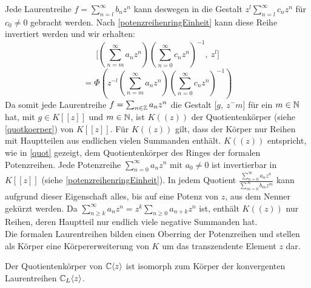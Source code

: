 {Jede Laurentreihe $ f = \sum_{n = l}^{\infty} b_nz^n $ kann deswegen in die Gestalt $z^l\sum_{n = l}^{\infty} c_nz^n $ für $c_0 \neq 0$ gebracht werden. Nach \ref{potenzreihenringEinheit} kann diese Reihe invertiert werden und wir erhalten:
\[\lbrack{\left(\sum_{n = m}^{\infty} a_nz^n\right)\left( \sum_{n = 0}^{\infty} c_nz^n\right)^{-1}},~{z^l}\rbrack\]
\[ = \Phi\left(z^{-l}\left(\sum_{n = m}^{\infty} a_nz^n\right)\left(\sum_{n = 0}^{\infty} c_nz^n\right)^{-1}\right)\]
%
Da somit jede Laurentreihe $ f = \sum_{n\in \mathbb{Z}} a_nz^n $ die Gestalt $\lbrack{g},~{z^-m}\rbrack$ für ein $m \in \mathbb{N}$ hat, mit $g\in K[[z]]$ und $m\in\mathbb{N}$, ist $K((z))$ der Quotientenkörper (siehe \ref{quotkoerper}) von $K[[z]]$.
}
%
%
Für $K((z))$ gilt, dass der Körper nur Reihen mit Hauptteilen aus endlichen vielen Summanden enthält. $K((z))$ entspricht, wie in \ref{quot} gezeigt, dem Quotientenkörper des Ringes der formalen Potenzreihen.  
Jede Potenzreihe $\sum_{n=0}^{\infty} a_nz^n \text{ mit } a_0\neq0$ ist invertierbar in $K[[z]]$ (siehe \ref{potenzreihenringEinheit}). In jedem Quotient $\frac{\sum_{n=0}^{\infty}  a_nz^n}{\sum_{m=0}^\infty b_mz^m}$ kann aufgrund dieser Eigenschaft alles, bis auf eine Potenz von $z$, aus dem Nenner gekürzt werden. Da  $\sum_{n \ge k}^{\infty} a_nz^n =z^k \sum_{n \ge 0} a_{n+k}z^n$ ist, enthält $K((z))$ nur Reihen, deren Hauptteil nur endlich viele negative Summanden hat. \\
%
Die formalen Laurentreihen bilden einen Oberring der Potenzreihen und stellen als Körper eine Körpererweiterung von $K$ um das transzendente Element $z$ dar.  %
%
%
\begin{satz}
Der Quotientenkörper von  $\mathbb{C}\langle z\rangle$ ist isomorph zum Körper der konvergenten Laurentreihen $\mathbb{C}_L \langle z \rangle$.
\end{satz}
